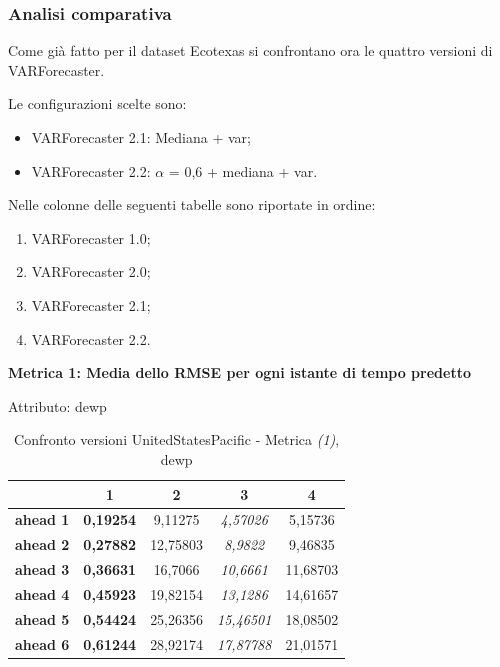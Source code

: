 \documentclass[12pt,a4paper,oneside,openright]{book}
\begin{document}
\newpage
\subsubsection{Analisi comparativa}
Come già fatto per il dataset Ecotexas si confrontano ora le quattro versioni di VARForecaster.

Le configurazioni scelte sono:
\begin{itemize}
\item VARForecaster 2.1: Mediana + var;
\item VARForecaster 2.2: $\alpha$ = 0,6 + mediana + var.
\end{itemize}

Nelle colonne delle seguenti tabelle sono riportate in ordine:
\begin{enumerate}
\item VARForecaster 1.0;
\item VARForecaster 2.0;
\item VARForecaster 2.1;
\item VARForecaster 2.2.
\end{enumerate}

\medskip

\textbf{Metrica 1: Media dello RMSE per ogni istante di tempo predetto} 

\medskip

Attributo: dewp \\ 

\begin{table}[H]
\centering
\begin{tabular}{|c|c|c|c|c|}
\hline
& 1 & 2 & 3 & 4 \\
\hline
\textbf{ahead 1} & \textbf{0,19254} & 9,11275 & \textit{4,57026} & 5,15736\\
\hline
\textbf{ahead 2} & \textbf{0,27882} & 12,75803 & \textit{8,9822} & 9,46835\\
\hline
\textbf{ahead 3} & \textbf{0,36631} & 16,7066 & \textit{10,6661} & 11,68703\\
\hline
\textbf{ahead 4} & \textbf{0,45923} & 19,82154 & \textit{13,1286} & 14,61657\\
\hline
\textbf{ahead 5} & \textbf{0,54424} & 25,26356 & \textit{15,46501} & 18,08502\\
\hline
\textbf{ahead 6} & \textbf{0,61244} & 28,92174 & \textit{17,87788} & 21,01571\\
\hline
\end{tabular} \\
\caption{Confronto versioni UnitedStatesPacific - Metrica \textit{(1)}, dewp}
\end{table} 
\end{document}
